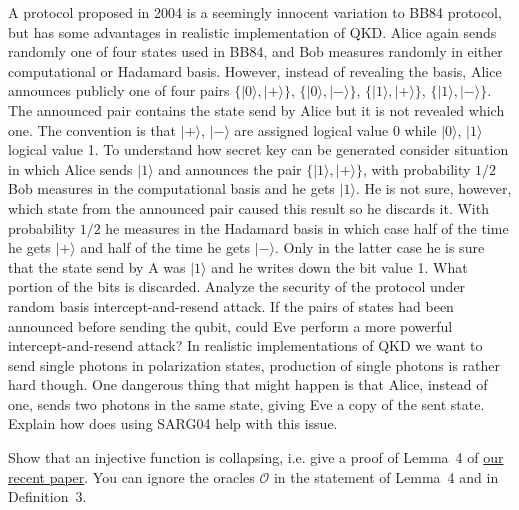 \documentclass[a4paper,10pt,landscape,twocolumn]{scrartcl}
\newcommand{\ket}[1]{| #1 \rangle}
\begin{document}
\begin{exercise}
A protocol proposed in 2004 is a seemingly innocent variation to BB84 protocol, but has some advantages in realistic implementation of QKD. Alice again sends randomly one of four states used in BB84, and Bob measures randomly in either computational or Hadamard basis. However, instead of revealing the basis, Alice announces publicly one of four pairs $\{ \ket{0},\ket{+} \}$, $\{ \ket{0},\ket{-} \}$, $\{ \ket{1},\ket{+} \}$, $\{ \ket{1},\ket{-} \}$. The announced pair contains the state send by Alice but it is not revealed which one. The convention is that $\ket{+}$, $\ket{-}$ are assigned logical value 0 while $\ket{0}$, $\ket{1}$ logical value 1. To understand how secret key can be generated consider situation in which Alice sends $\ket{1}$ and announces the pair $\{ \ket{1},\ket{+} \}$, with probability $1/2$ Bob measures in the computational basis and he gets $\ket{1}$. He is not sure, however, which state from the announced pair caused this result so he discards it. With probability $1/2$ he measures in the Hadamard basis in which case half of the time he gets $\ket{+}$ and half of the time he gets $\ket{-}$. Only in the latter case he is sure that the state send by A was $\ket{1}$ and he writes down the bit value 1. What portion of the bits is discarded. Analyze the security of the protocol under random basis intercept-and-resend attack. If the pairs of states had been announced before sending the qubit, could Eve perform a more powerful intercept-and-resend attack? In realistic implementations of QKD we want to send single photons in polarization states, production of single photons is rather hard though. One dangerous thing that might happen is that Alice, instead of one, sends two photons in the same state, giving Eve a copy of the sent state. Explain how does using SARG04 help with this issue.
\end{exercise}



\begin{exercise}
Show that an injective function is collapsing, i.e. give a proof of Lemma~4 of \href{https://eprint.iacr.org/2017/771.pdf}{our recent paper}. You can ignore the oracles $\mathcal{O}$ in the statement of Lemma~4 and in Definition~3.
\end{exercise}
\end{document}
